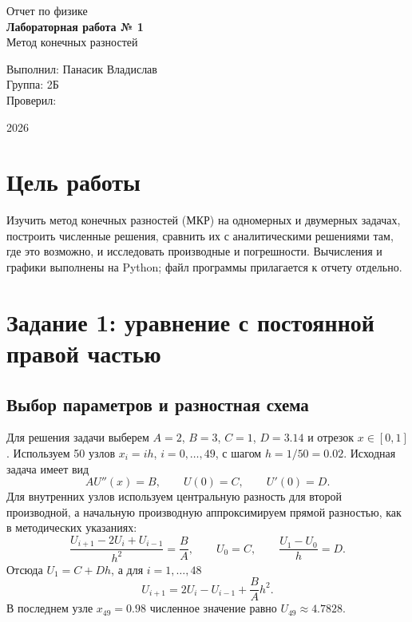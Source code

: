 \documentclass[12pt,a4paper]{article}
\begin{document}
\begin{titlepage}
\begin{center}
\large Отчет по физике\\[1.5cm]
\Large\textbf{Лабораторная работа № 1}\\[0.4cm]
\large Метод конечных разностей\\[2cm]
\end{center}

\begin{flushright}
Выполнил: Панасик Владислав\\[0.5cm]
Группа: 2Б\\[0.5cm]
Проверил: \underline{\hspace{5cm}}
\end{flushright}

\vfill
\begin{center}
2026
\end{center}
\end{titlepage}

\section{Цель работы}
Изучить метод конечных разностей (МКР) на одномерных и двумерных задачах,
построить численные решения, сравнить их с аналитическими решениями там,
где это возможно, и исследовать производные и погрешности. Вычисления и
графики выполнены на Python; файл программы прилагается к отчету отдельно.

\section{Задание 1: уравнение с постоянной правой частью}
\subsection{Выбор параметров и разностная схема}
Для решения задачи выберем \(A=2\), \(B=3\), \(C=1\),
\(D=3.14\) и отрезок \(x\in[0,1]\). Используем 50 узлов
\(x_i=ih\), \(i=0,\ldots,49\), с шагом \(h=1/50=0.02\).
Исходная задача имеет вид
\[
A U''(x)=B,\qquad U(0)=C,\qquad U'(0)=D.
\]
Для внутренних узлов используем центральную разность для второй производной,
а начальную производную аппроксимируем прямой разностью, как в методических
указаниях:
\[
\frac{U_{i+1}-2U_i+U_{i-1}}{h^2}=\frac BA,\qquad
U_0=C,\qquad \frac{U_1-U_0}{h}=D.
\]
Отсюда \(U_1=C+Dh\), а для \(i=1,\ldots,48\)
\[
U_{i+1}=2U_i-U_{i-1}+\frac BA h^2.
\]
В последнем узле \(x_{49}=0.98\) численное значение равно
\(U_{49}\approx4.7828\).
\end{document}
